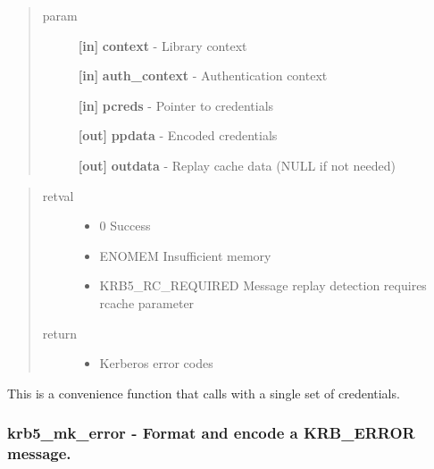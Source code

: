 \documentclass[letterpaper,10pt,english]{sphinxmanual}
\begin{document}
\begin{quote}\begin{description}
\item[{param}] \leavevmode
\textbf{{[}in{]}} \textbf{context} - Library context

\textbf{{[}in{]}} \textbf{auth\_context} - Authentication context

\textbf{{[}in{]}} \textbf{pcreds} - Pointer to credentials

\textbf{{[}out{]}} \textbf{ppdata} - Encoded credentials

\textbf{{[}out{]}} \textbf{outdata} - Replay cache data (NULL if not needed)

\end{description}\end{quote}
\begin{quote}\begin{description}
\item[{retval}] \leavevmode\begin{itemize}
\item {} 
0   Success

\item {} 
ENOMEM   Insufficient memory

\item {} 
KRB5\_RC\_REQUIRED   Message replay detection requires rcache parameter

\end{itemize}

\item[{return}] \leavevmode\begin{itemize}
\item {} 
Kerberos error codes

\end{itemize}

\end{description}\end{quote}

This is a convenience function that calls {\hyperref[appdev/refs/api/krb5_mk_ncred:c.krb5_mk_ncred]{}} with a single set of credentials.


\subsubsection{krb5\_mk\_error -  Format and encode a KRB\_ERROR message.}
\label{appdev/refs/api/krb5_mk_error:krb5-mk-error-format-and-encode-a-krb-error-message}\label{appdev/refs/api/krb5_mk_error::doc}
\end{document}
